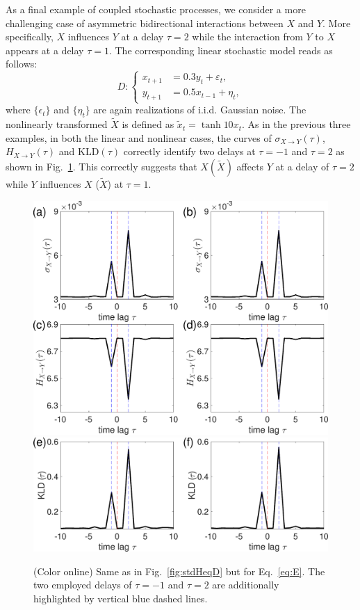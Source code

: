 \documentclass[12pt,aip,cha,reprint,nofootinbib]{revtex4-1}
\begin{document}
As a final example of coupled stochastic processes, we consider a more challenging case of asymmetric bidirectional interactions between $X$ and $Y$. More specifically, $X$ influences $Y$ at a delay $\tau = 2$ while the interaction from $Y$ to $X$ appears at a delay $\tau = 1$. The corresponding linear stochastic model reads as follows: 
\begin{equation} \label{eq:E}
D: \left \{ \begin{aligned}
x_{t+1} &= 0.3 y_{t} + \varepsilon_t, \\
y_{t+1} &= 0.5 x_{t-1} + \eta_t, 
\end{aligned}
\right.
\end{equation}
where $\{ \epsilon_t \}$ and $\{ \eta_t \}$ are again realizations of i.i.d. Gaussian noise. The nonlinearly transformed $\tilde{X}$ is defined as $\tilde{x}_{t} = \tanh{10 x_t}$. As in the previous three examples, in both the linear and nonlinear cases, the curves of $\sigma_{X \to Y}(\tau)$, $H_{X\to Y}(\tau)$ and $\text{KLD}(\tau)$ correctly identify two delays at $\tau = -1$ and $\tau = 2$ as shown in Fig.~\ref{fig:stdHeqE}. This correctly suggests that $X (\tilde{X})$ affects $Y$ at a delay of $\tau = 2$ while $Y$ influences $X$ ($\tilde{X}$) at $\tau = 1$. 

\begin{figure}
	\centering
	\includegraphics[width=\columnwidth]{E_E.eps}
	\includegraphics[width=\columnwidth]{KL_E.eps}
\caption{(Color online) Same as in Fig.~\ref{fig:stdHeqD} but for Eq.~\eqref{eq:E}. The two employed delays of $\tau = -1$ and $\tau = 2$ are additionally highlighted by vertical blue dashed lines. \label{fig:stdHeqE}}
\end{figure}
\end{document}
